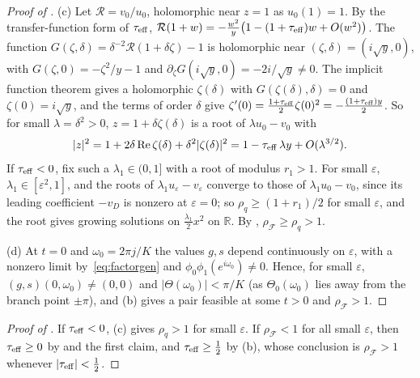 \documentclass[11pt]{article}
\theoremstyle{definition}
\theoremstyle{remark}
\newcommand{\R}{\mathbb R}
\newcommand{\cF}{\mathcal F}
\newcommand{\Rea}{\operatorname{Re}}
\newcommand{\rhoF}{\rho_{\cF}}
\newcommand{\teff}{\tau_{\rm eff}}
\begin{document}
\begin{proof}[Proof of ]
(c) Let \(\mathcal R=v_0/u_0\), holomorphic near \(z=1\) as \(u_0(1)=1\).  By the transfer-function form of \(\teff\),
\(\mathcal R(1+w)=-\frac{w^2}y\bigl(1-(1+\teff)w+O(w^2)\bigr)\).  The function \(G(\zeta,\delta)=\delta^{-2}\mathcal R(1+\delta\zeta)-1\) is holomorphic near
\((\zeta,\delta)=(i\sqrt y,0)\), with \(G(\zeta,0)=-\zeta^2/y-1\) and \(\partial_\zeta G(i\sqrt y,0)=-2i/\sqrt y\ne0\).  The implicit function theorem
gives a holomorphic \(\zeta(\delta)\) with \(G(\zeta(\delta),\delta)=0\) and \(\zeta(0)=i\sqrt y\), and the terms of order \(\delta\) give
\(\zeta'(0)=\frac{1+\teff}2\zeta(0)^2=-\frac{(1+\teff)y}2\).  So for small \(\lambda=\delta^2>0\), \(z=1+\delta\zeta(\delta)\) is a root of \(\lambda u_0-v_0\) with
\[
|z|^2=1+2\delta\Rea\zeta(\delta)+\delta^2|\zeta(\delta)|^2=1-\teff\,\lambda y+O(\lambda^{3/2}).
\]
If \(\teff<0\), fix such a \(\lambda_1\in(0,1]\) with a root of modulus \(r_1>1\).  For small \(\varepsilon\), \(\lambda_1\in[\varepsilon^2,1]\), and the roots of
\(\lambda_1u_\varepsilon-v_\varepsilon\) converge to those of \(\lambda_1u_0-v_0\), since its leading coefficient \(-v_D\) is nonzero at
\(\varepsilon=0\); so \(\rho_q\ge(1+r_1)/2\) for small \(\varepsilon\), and the root gives growing solutions on \(\frac{\lambda_1}2x^2\) on \(\R\).  By
, \(\rhoF\ge\rho_q>1\).

(d) At \(t=0\) and \(\omega_0=2\pi j/K\) the values \(g,s\) depend continuously on \(\varepsilon\), with a nonzero limit
by~\eqref{eq:factorgen} and \(\phi_0\phi_1(e^{i\omega_0})\ne0\).
Hence, for small \(\varepsilon\), \((g,s)(0,\omega_0)\ne(0,0)\) and \(|\Theta(\omega_0)|<\pi/K\) (as \(\Theta_0(\omega_0)\) lies away from the branch point \(\pm\pi\)), and
(b) gives a pair feasible at some \(t>0\) and \(\rhoF>1\).
\end{proof}

\begin{proof}[Proof of ]
If \(\teff<0\), (c) gives \(\rho_q>1\) for small \(\varepsilon\).  If \(\rhoF<1\) for all small \(\varepsilon\), then
\(\teff\ge0\) by  and the first claim, and \(\teff\ge\frac12\) by (b), whose conclusion is
\(\rhoF>1\) whenever \(|\teff|<\frac12\).
\end{proof}
\end{document}
